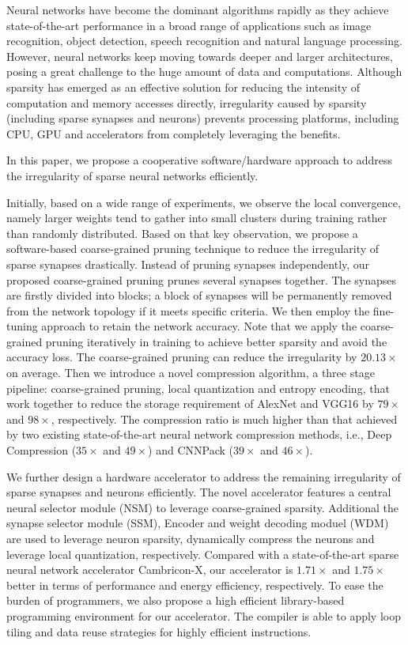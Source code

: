 \begin{enabstract}
Neural networks have become the dominant algorithms rapidly as they achieve state-of-the-art performance in a broad range of applications such as image recognition, object detection, speech recognition and natural language processing. However, neural networks keep moving towards deeper and larger architectures, posing a great challenge to the huge amount of data and computations. Although sparsity has emerged as an effective solution for reducing the intensity of computation and memory accesses directly, irregularity caused by sparsity (including sparse synapses and neurons) prevents processing platforms, including CPU, GPU and accelerators from completely leveraging the benefits. 

In this paper, we propose a cooperative software/hardware approach to address the irregularity of sparse neural networks efficiently. 

Initially, based on a wide range of experiments, we observe the local convergence, namely larger weights tend to gather into small clusters during training rather than randomly distributed. Based on that key observation, we propose a software-based coarse-grained pruning technique to reduce the irregularity of sparse synapses drastically. Instead of pruning synapses independently, our proposed coarse-grained pruning prunes several synapses together. The synapses are firstly divided into blocks; a block of synapses will be permanently removed from the network topology if it meets specific criteria. We then employ the fine-tuning approach to retain the network accuracy. Note that we apply the coarse-grained pruning iteratively in training to achieve better sparsity and avoid the accuracy loss. The coarse-grained pruning can reduce the irregularity by $20.13\times$ on average. Then we introduce a novel compression algorithm, a three stage pipeline: coarse-grained pruning, local quantization and entropy encoding, that work together to reduce the storage requirement of AlexNet and VGG16 by $79\times$ and $98\times$, respectively. The compression ratio is much higher than that achieved by two existing state-of-the-art neural network compression methods, i.e., Deep Compression ($35\times$ and $49\times$) and CNNPack ($39\times$ and $46\times$).

We further design a hardware accelerator to address the remaining irregularity of sparse synapses and neurons efficiently. The novel accelerator features a central neural selector module (NSM) to leverage coarse-grained sparsity. Additional the synapse selector module (SSM), Encoder and weight decoding moduel (WDM) are used to leverage neuron sparsity, dynamically compress the neurons and leverage local quantization, respectively. Compared with a state-of-the-art sparse neural network accelerator Cambricon-X, our accelerator is $1.71\times$ and $1.75\times$ better in terms of performance and energy efficiency, respectively. To ease the burden of programmers, we also propose a high efficient library-based programming environment for our accelerator. The compiler is able to apply loop tiling and data reuse strategies for highly efficient instructions. 

\end{enabstract}
